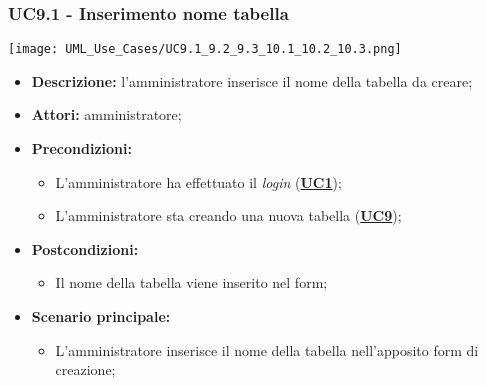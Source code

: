 \subsubsection{UC9.1 - Inserimento nome tabella}
\label{sec:UC9.1}
\texttt{[image: UML\_Use\_Cases/UC9.1\_9.2\_9.3\_10.1\_10.2\_10.3.png]}
\begin{itemize}
	\item \textbf{Descrizione:} l’amministratore inserisce il nome della tabella da creare;
	\item \textbf{Attori:} amministratore;
	\item \textbf{Precondizioni:} 
	\begin{itemize}
		\item L’amministratore ha effettuato il \textit{login} (\hyperref[sec:UC1]{\textbf{UC1}});
		\item L’amministratore sta creando una nuova tabella (\hyperref[sec:UC9]{\textbf{UC9}});
	\end{itemize}
	\item \textbf{Postcondizioni:} 
	\begin{itemize}
		\item Il nome della tabella viene inserito nel form;
	\end{itemize}
	\item \textbf{Scenario principale:} 
	\begin{itemize}
		\item L’amministratore inserisce il nome della tabella nell'apposito form di creazione;
	\end{itemize}
\end{itemize}

